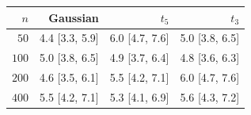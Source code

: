 \begin{tabular*}{\linewidth}{@{\extracolsep{\fill}}r@{\hspace{14pt}}rrr@{}}
\hline
$n$ & Gaussian & $t_5$ & $t_3$ \\
\hline
$50$ & 4.4 [3.3, 5.9] & 6.0 [4.7, 7.6] & 5.0 [3.8, 6.5] \\
$100$ & 5.0 [3.8, 6.5] & 4.9 [3.7, 6.4] & 4.8 [3.6, 6.3] \\
$200$ & 4.6 [3.5, 6.1] & 5.5 [4.2, 7.1] & 6.0 [4.7, 7.6] \\
$400$ & 5.5 [4.2, 7.1] & 5.3 [4.1, 6.9] & 5.6 [4.3, 7.2] \\
\hline
\end{tabular*}
